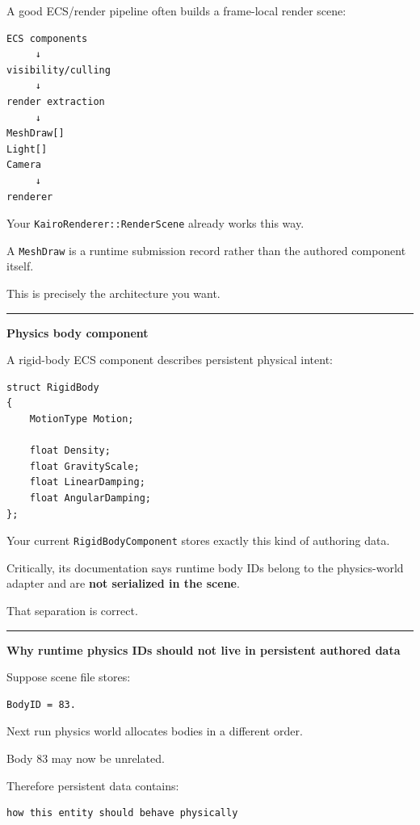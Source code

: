 A good ECS/render pipeline often builds a frame-local render scene:

\begin{verbatim}
ECS components
     ↓
visibility/culling
     ↓
render extraction
     ↓
MeshDraw[]
Light[]
Camera
     ↓
renderer
\end{verbatim}

Your \texttt{KairoRenderer::RenderScene} already works this way.

A \texttt{MeshDraw} is a runtime submission record rather than the authored component itself.

This is precisely the architecture you want.

\begin{center}\rule{0.5\linewidth}{0.5pt}\end{center}

\textbf{Physics body component}

A rigid-body ECS component describes persistent physical intent:

\begin{verbatim}
struct RigidBody
{
    MotionType Motion;

    float Density;
    float GravityScale;
    float LinearDamping;
    float AngularDamping;
};
\end{verbatim}

Your current \texttt{RigidBodyComponent} stores exactly this kind of authoring data.

Critically, its documentation says runtime body IDs belong to the physics-world adapter and are \textbf{not serialized in the scene}.

That separation is correct.

\begin{center}\rule{0.5\linewidth}{0.5pt}\end{center}

\textbf{Why runtime physics IDs should not live in persistent authored data}

Suppose scene file stores:

\begin{verbatim}
BodyID = 83.
\end{verbatim}

Next run physics world allocates bodies in a different order.

Body 83 may now be unrelated.

Therefore persistent data contains:

\begin{verbatim}
how this entity should behave physically
\end{verbatim}

